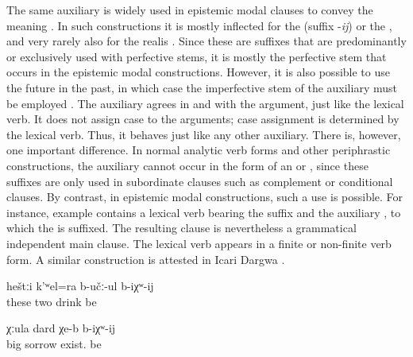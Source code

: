 The same auxiliary is widely used in epistemic modal clauses to convey the meaning . In such constructions it is mostly inflected for the  (suffix -\textit{ij})  or the   , and very rarely also for the realis   . Since these are suffixes that are predominantly or exclusively used with perfective stems, it is mostly the perfective stem  that occurs in the epistemic modal constructions. However, it is also possible to use the future in the past, in which case the imperfective stem of the auxiliary must be employed . The auxiliary agrees in  and  with the  argument, just like the lexical verb. It does not assign case to the arguments; case assignment is determined by the lexical verb. Thus, it behaves just like any other auxiliary. There is, however, one important difference. In normal analytic verb forms and other periphrastic constructions, the auxiliary cannot occur in the form of an  or , since these suffixes are only used in subordinate clauses such as complement or conditional clauses. By contrast, in epistemic modal constructions, such a use is possible. For instance, example  contains a lexical verb bearing the  suffix and the auxiliary , to which the  is suffixed. The resulting clause is nevertheless a grammatical independent main clause. The lexical verb appears in a finite or non-finite verb form. A similar construction is attested in Icari Dargwa \citep[110]{Sumbatova.Mutalov2003}.

\begin{exe}
	\ex	\label{ex:These two are probably drinking}
	\gll	heštːi	k'ʷel=ra	b-učː-ul	b-iχʷ-ij\\
		these	two	drink	be\\
	\glt	{}

	\ex	\label{ex:(He) probably has big sorrows}
	\gll	χːula	dard	χe-b	b-iχʷ-ij\\
		big	sorrow	exist.		be\\
	\glt	{}
\end{exe}

